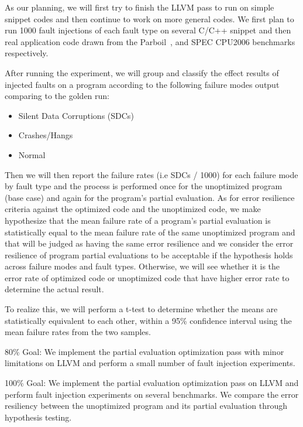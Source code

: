As our planning, we will first try to finish the LLVM pass to run on simple snippet codes and then continue to work on more general codes. 
We first plan to run 1000 fault injections of each fault type on several C/C++ snippet and then real application code drawn from the Parboil~\cite{Parboil}, and SPEC CPU2006 benchmarks~\cite{SPEC} respectively.

After running the experiment, we will group and classify the effect results of injected faults on a program according to the following failure modes output comparing to the golden run: 
\begin{itemize}
\item Silent Data Corruptions (SDCs) 
\item Crashes/Hangs
\item Normal 
\end{itemize}

Then we will then report the failure rates (i.e SDCs / 1000) for each failure mode by fault type and the process is performed once for the unoptimized program (base case) and again for the program's partial evaluation.
As for error resilience criteria against the optimized code and the unoptimized code, we make hypothesize that the mean failure rate of a program's partial evaluation is statistically equal to the mean failure rate of the same unoptimized program and that will be judged as having the same error resilience and we consider the error resilience of program partial evaluations to be acceptable if the hypothesis holds across failure modes and fault types. Otherwise, we will see whether it is the error rate of optimized code or unoptimized code that have higher error rate to determine the actual result.

To realize this, we will perform a t-test to determine whether the means are statistically equivalent to each other, within a 95\% confidence interval using the mean failure rates from the two samples.

80\% Goal: We implement the partial evaluation optimization pass with minor limitations on LLVM and perform a small number of fault injection experiments.

100\% Goal: We implement the partial evaluation optimization pass on LLVM and perform fault injection experiments on several benchmarks. We compare the error resiliency between the unoptimized program and its partial evaluation through hypothesis testing. 
